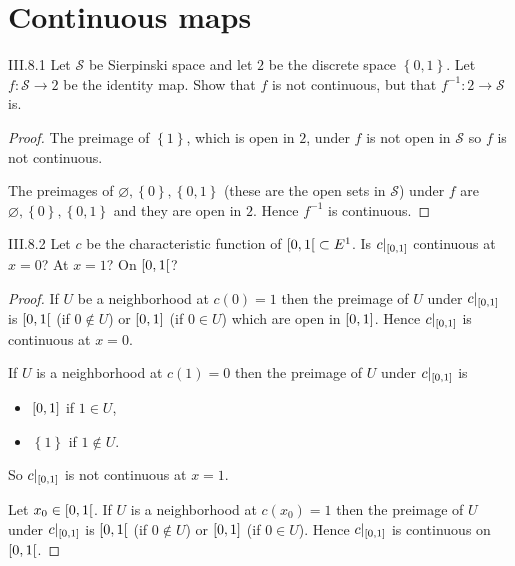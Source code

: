 \section{Continuous maps}

\begin{problem}{III.8.1}
Let \( \mathscr{S} \) be Sierpinski space and let \(2\) be the discrete space \( \left\{ 0, 1 \right\} \). Let \( f: \mathscr{S} \to 2 \) be the identity map. Show that \( f \) is not continuous, but that \( f^{-1}: 2 \to \mathscr{S} \) is.
\end{problem}

\begin{proof}
	The preimage of \( \left\{ 1 \right\} \), which is open in \(2\), under \( f \) is not open in \( \mathscr{S} \) so \( f \) is not continuous.

	The preimages of \( \varnothing, \left\{ 0 \right\}, \left\{ 0, 1 \right\} \) (these are the open sets in \(\mathscr{S}\)) under \( f \) are \( \varnothing, \left\{ 0 \right\}, \left\{ 0, 1 \right\} \) and they are open in \( 2 \). Hence \( f^{-1} \) is continuous.
\end{proof}

\begin{problem}{III.8.2}
Let \(c\) be the characteristic function of \( \left[{0, 1}\right[ \subset E^{1} \). Is \( c\vert_{\left[{0, 1}\right]} \) continuous at \( x = 0 \)? At \( x = 1 \)? On \( \left[{0, 1}\right[ \)?
\end{problem}

\begin{proof}
	If \(U\) be a neighborhood at \( c(0) = 1 \) then the preimage of \(U\) under \( c\vert_{\left[{0,1}\right]} \) is \( \left[{0,1}\right[ \) (if \( 0 \notin U \)) or \( \left[{0, 1}\right] \) (if \( 0 \in U \)) which are open in \( \left[{0,1}\right] \). Hence \( c\vert_{\left[{0,1}\right]} \) is continuous at \( x = 0 \).

	If \( U \) is a neighborhood at \( c(1) = 0 \) then the preimage of \(U\) under \( c\vert_{\left[{0,1}\right]} \) is
	\begin{itemize}[itemsep=0pt,topsep=0pt]
		\item \( \left[{0,1}\right] \) if \( 1 \in U \),
		\item \( \left\{1\right\} \) if \( 1 \notin U \).
	\end{itemize}

	So \( c\vert_{\left[{0,1}\right]} \) is not continuous at \( x = 1 \).

	Let \( x_{0} \in \left[{0, 1}\right[ \). If \( U \) is a neighborhood at \( c(x_{0}) = 1 \) then the preimage of \( U \) under \( c\vert_{\left[{0,1}\right]} \) is \( \left[{0,1}\right[ \) (if \( 0 \notin U \)) or \( \left[{0,1}\right] \) (if \( 0 \in U \)). Hence \( c\vert_{\left[{0,1}\right]} \) is continuous on \( \left[{0,1}\right[ \).
\end{proof}

